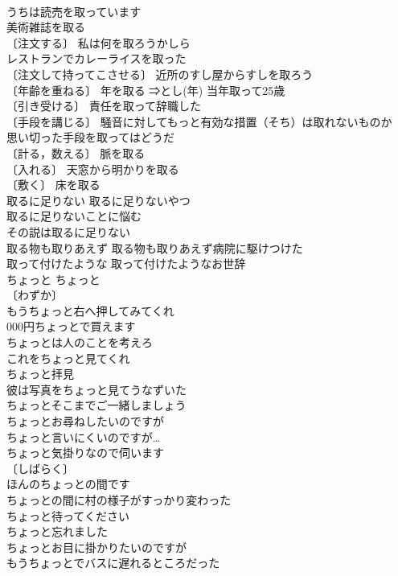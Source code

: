 \documentclass[8pt]{extreport}
\begin{document}
\begin{CJK}{UTF8}{min}
\\	うちは読売を取っています 
\\	美術雑誌を取る 
\\	〔注文する〕 私は何を取ろうかしら 
\\	レストランでカレーライスを取った 
\\	〔注文して持ってこさせる〕 近所のすし屋からすしを取ろう 
\\	〔年齢を重ねる〕 年を取る ⇒とし(年) 当年取って25歳 
\\	〔引き受ける〕 責任を取って辞職した 
\\	〔手段を講じる〕 騒音に対してもっと有効な措置（そち）は取れないものか 
\\	思い切った手段を取ってはどうだ 
\\	〔計る，数える〕 脈を取る　
\\	〔入れる〕 天窓から明かりを取る 
\\	〔敷く〕 床を取る 
\\	取るに足りない 取るに足りないやつ 
\\	取るに足りないことに悩む 
\\	その説は取るに足りない 
\\	取る物も取りあえず 取る物も取りあえず病院に駆けつけた 
\\	取って付けたような 取って付けたようなお世辞 
\\	ちょっと	ちょっと	
\\	〔わずか〕
\\	もうちょっと右へ押してみてくれ 
\\	000円ちょっとで買えます 
\\	ちょっとは人のことを考えろ 
\\	これをちょっと見てくれ 
\\	ちょっと拝見 
\\	彼は写真をちょっと見てうなずいた 
\\	ちょっとそこまでご一緒しましょう 
\\	ちょっとお尋ねしたいのですが 
\\	ちょっと言いにくいのですが… 
\\	ちょっと気掛りなので伺います 
\\	〔しばらく〕
\\	ほんのちょっとの間です 
\\	ちょっとの間に村の様子がすっかり変わった 
\\	ちょっと待ってください 
\\	ちょっと忘れました 
\\	ちょっとお目に掛かりたいのですが 
\\	もうちょっとでバスに遅れるところだった 

\end{CJK}
\end{document}
